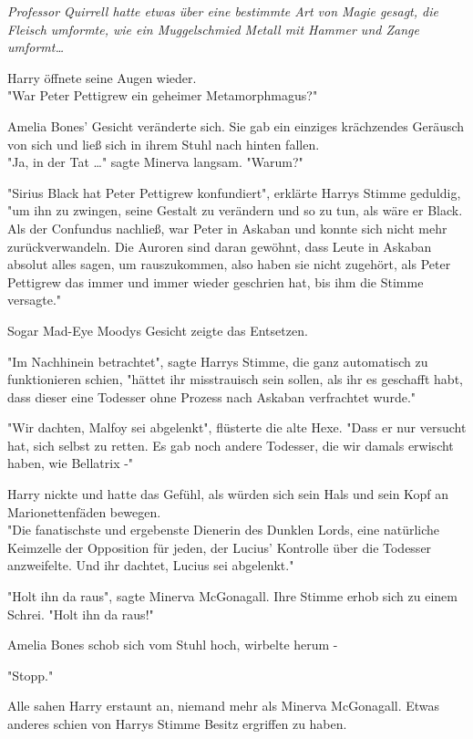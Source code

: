 {\emph{Professor Quirrell hatte etwas über eine bestimmte Art von Magie gesagt, die Fleisch umformte, wie ein Muggelschmied Metall mit Hammer und Zange umformt…}

Harry öffnete seine Augen wieder.\\ "War Peter Pettigrew ein geheimer Metamorphmagus?"

Amelia Bones' Gesicht veränderte sich. Sie gab ein einziges krächzendes Geräusch von sich und ließ sich in ihrem Stuhl nach hinten fallen.\\ "Ja, in der Tat …" sagte Minerva langsam. "Warum?"

"Sirius Black hat Peter Pettigrew konfundiert", erklärte Harrys Stimme geduldig,\\ "um ihn zu zwingen, seine Gestalt zu verändern und so zu tun, als wäre er Black.\\ Als der Confundus nachließ, war Peter in Askaban und konnte sich nicht mehr zurückverwandeln. Die Auroren sind daran gewöhnt, dass Leute in Askaban absolut alles sagen, um rauszukommen, also haben sie nicht zugehört, als Peter Pettigrew das immer und immer wieder geschrien hat, bis ihm die Stimme versagte."

Sogar Mad-Eye Moodys Gesicht zeigte das Entsetzen.

"Im Nachhinein betrachtet", sagte Harrys Stimme, die ganz automatisch zu funktionieren schien, "hättet ihr misstrauisch sein sollen, als ihr es geschafft habt, dass dieser eine Todesser ohne Prozess nach Askaban verfrachtet wurde."

"Wir dachten, Malfoy sei abgelenkt", flüsterte die alte Hexe. "Dass er nur versucht hat, sich selbst zu retten. Es gab noch andere Todesser, die wir damals erwischt haben, wie Bellatrix -"

Harry nickte und hatte das Gefühl, als würden sich sein Hals und sein Kopf an Marionettenfäden bewegen.\\ "Die fanatischste und ergebenste Dienerin des Dunklen Lords, eine natürliche Keimzelle der Opposition für jeden, der Lucius' Kontrolle über die Todesser anzweifelte. Und ihr dachtet, Lucius sei abgelenkt."

"Holt ihn da raus", sagte Minerva McGonagall. Ihre Stimme erhob sich zu einem Schrei. "Holt ihn da raus!"

Amelia Bones schob sich vom Stuhl hoch, wirbelte herum -

"Stopp."

Alle sahen Harry erstaunt an, niemand mehr als Minerva McGonagall. Etwas anderes schien von Harrys Stimme Besitz ergriffen zu haben.

}
